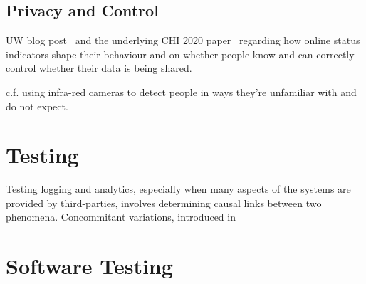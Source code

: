 \subsection{Privacy and Control}

UW blog post~\cite{mcquate_I_saw_you_were_online} and the underlying CHI 2020 paper~\cite{cobb2020_ux_s_with_online_status_indicators} regarding how online status indicators shape their behaviour and on whether people know and can correctly control whether their data is being shared.

c.f. using infra-red cameras to detect people in ways they're unfamiliar with and do not expect. 

\section{Testing}
Testing logging and analytics, especially when many aspects of the systems are provided by third-parties, involves determining causal links between two phenomena. Concommitant variations, introduced in~\cite{mill1884system} 


\section{Software Testing}

